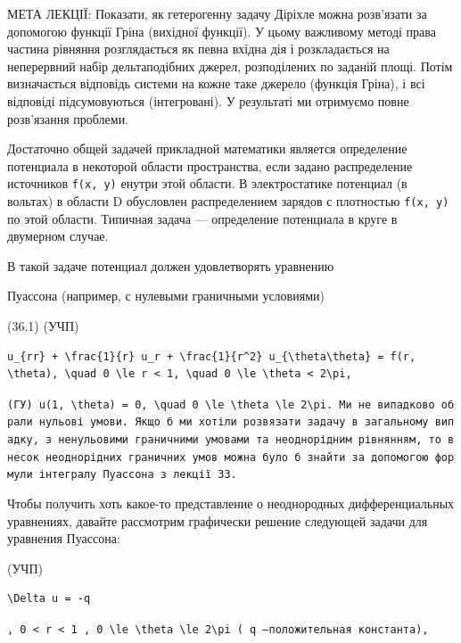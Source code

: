 \documentclass[
  ukrainian,
]{article}
\begin{document}
МЕТА ЛЕКЦІЇ: Показати, як гетерогенну задачу Діріхле можна розв'язати за
допомогою функції Гріна (вихідної функції). У цьому важливому методі
права частина рівняння розглядається як певна вхідна дія і розкладається
на неперервний набір дельтаподібних джерел, розподілених по заданій
площі. Потім визначається відповідь системи на кожне таке джерело
(функція Гріна), і всі відповіді підсумовуються (інтегровані). У
результаті ми отримуємо повне розв'язання проблеми.

Достаточно общей задачей прикладной математики является определение
потенциала в некоторой области пространства, если задано распределение
источников \texttt{f(x,\ y)} енутри этой области. В электростатике
потенциал (в вольтах) в области D обусловлен распределением зарядов с
плотностью \texttt{f(x,\ y)} по этой области. Типичная задача ---
определение потенциала в круге в двумерном случае.

В такой задаче потенциал должен удовлетворять уравнению

Пуассона (например, с нулевыми граничными условиями)

(36.1) (УЧП)

\begin{verbatim}
u_{rr} + \frac{1}{r} u_r + \frac{1}{r^2} u_{\theta\theta} = f(r, \theta), \quad 0 \le r < 1, \quad 0 \le \theta < 2\pi,
\end{verbatim}

\texttt{(ГУ)\ \textquotesingle{}u(1,\ \textbackslash{}theta)\ =\ 0,\ \textbackslash{}quad\ 0\ \textbackslash{}le\ \textbackslash{}theta\ \textbackslash{}le\ 2\textbackslash{}pi.\textquotesingle{}\ Ми\ не\ випадково\ обрали\ нульові\ умови.\ Якщо\ б\ ми\ хотіли\ розв\textquotesingle{}язати\ задачу\ в\ загальному\ випадку,\ з\ ненульовими\ граничними\ умовами\ та\ неоднорідним\ рівнянням,\ то\ внесок\ неоднорідних\ граничних\ умов\ можна\ було\ б\ знайти\ за\ допомогою\ формули\ інтегралу\ Пуассона\ з\ лекції\ 33.}

Чтобы получить хоть какое-то представление о неоднородных
дифференциальных уравнениях, давайте рассмотрим графически решение
следующей задачи для уравнения Пуассона:

(УЧП)

\begin{verbatim}
\Delta u = -q
\end{verbatim}

\texttt{,\ \textquotesingle{}0\ \textless{}\ r\ \textless{}\ 1\textquotesingle{}\ ,\ \textquotesingle{}0\ \textbackslash{}le\ \textbackslash{}theta\ \textbackslash{}le\ 2\textbackslash{}pi\textquotesingle{}\ (\ \textquotesingle{}q\textquotesingle{}\ —положительная\ константа),}
\end{document}
